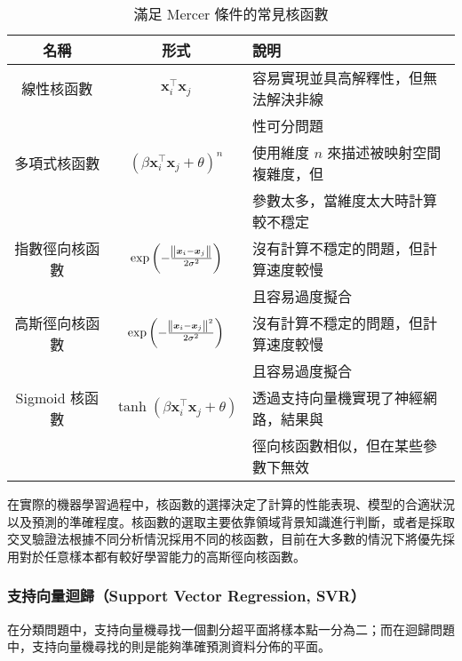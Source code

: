 \begin{table}[htp]
  \centering
  \caption[滿足 Mercer 條件的常見核函數]{滿足 Mercer 條件的常見核函數}
  \begin{tabular*}{\textwidth}{ccl}
    \toprule
    \textbf{名稱}   & \textbf{形式}            & \textbf{說明}          \\
    \midrule
    線性核函數      & $\boldsymbol{x}_{i}^{\top} \boldsymbol{x}_{j}$ & 容易實現並具高解釋性，但無法解決非線 \\
                    &   & 性可分問題            \\
    多項式核函數    & $\left( \beta \boldsymbol{x}_{i}^{\top} \boldsymbol{x}_{j} + \theta \right)^{n}$ & 使用維度 $n$ 來描述被映射空間複雜度，但 \\
                    &   & 參數太多，當維度太大時計算較不穩定 \\
    指數徑向核函數  & $\exp \left(-\frac{\norm{\boldsymbol{x}_{i} - \boldsymbol{x}_{j}}}{2\sigma^2} \right)$ & 沒有計算不穩定的問題，但計算速度較慢 \\ 
                    &   & 且容易過度擬合 \\
    高斯徑向核函數  & $\exp \left(-\frac{\norm{\boldsymbol{x}_{i} - \boldsymbol{x}_{j}}^2}{2\sigma^2} \right)$ & 沒有計算不穩定的問題，但計算速度較慢 \\ 
                    &   & 且容易過度擬合 \\
    Sigmoid 核函數  & $\tanh{\left( \beta \boldsymbol{x}_{i}^{\top} \boldsymbol{x}_{j} + \theta \right)}$ & 透過支持向量機實現了神經網路，結果與 \\
                    &   & 徑向核函數相似，但在某些參數下無效 \\
    \bottomrule
  \end{tabular*}
  \label{table: Kernal Functions}
\end{table}

在實際的機器學習過程中，核函數的選擇決定了計算的性能表現、模型的合適狀況以及預測的準確程度。核函數的選取主要依靠領域背景知識進行判斷，或者是採取交叉驗證法根據不同分析情況採用不同的核函數，目前在大多數的情況下將優先採用對於任意樣本都有較好學習能力的高斯徑向核函數。

\subsubsection{支持向量迴歸（Support Vector Regression, SVR）}

在分類問題中，支持向量機尋找一個劃分超平面將樣本點一分為二；而在迴歸問題中，支持向量機尋找的則是能夠準確預測資料分佈的平面。

